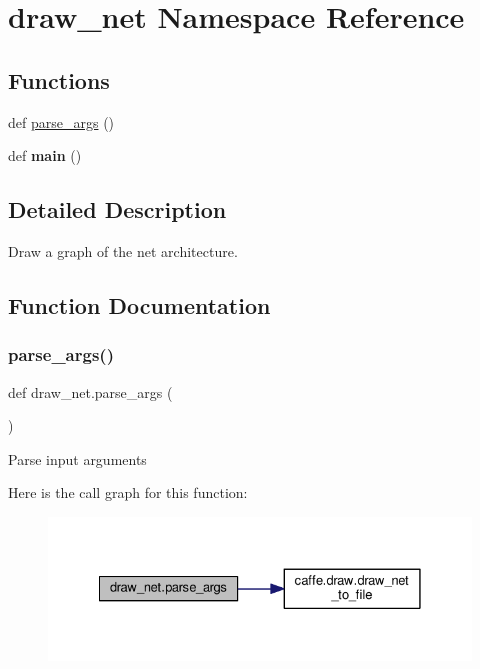 \hypertarget{namespacedraw__net}{}\section{draw\+\_\+net Namespace Reference}
\label{namespacedraw__net}
\subsection*{Functions}
\begin{DoxyCompactItemize}
\item 
def \mbox{\hyperlink{namespacedraw__net_a54a6010be784238d4fb0b8c88ace02d3}{parse\+\_\+args}} ()
\item 
\mbox{\label{namespacedraw__net_aadad23c311abc8899855157f758ccf0a}} 
def {\bfseries main} ()
\end{DoxyCompactItemize}


\subsection{Detailed Description}
\begin{DoxyVerb}Draw a graph of the net architecture.
\end{DoxyVerb}
 

\subsection{Function Documentation}
\mbox{\label{namespacedraw__net_a54a6010be784238d4fb0b8c88ace02d3}} 
\subsubsection{\texorpdfstring{parse\+\_\+args()}{parse\_args()}}
{\footnotesize\ttfamily def draw\+\_\+net.\+parse\+\_\+args (\begin{DoxyParamCaption}{ }\end{DoxyParamCaption})}

\begin{DoxyVerb}Parse input arguments
\end{DoxyVerb}
 Here is the call graph for this function\+:
\nopagebreak
\begin{figure}[H]
\begin{center}
\leavevmode
\includegraphics[width=328pt]{namespacedraw__net_a54a6010be784238d4fb0b8c88ace02d3_cgraph}
\end{center}
\end{figure}
